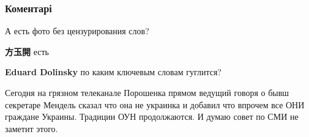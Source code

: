  
 
 
 
 
\subsubsection{Коментарі}

\begin{itemize}
 
А есть фото без цензурирования слов?

\begin{itemize}
 
\textbf{方玉開} есть

 
\textbf{Eduard Dolinsky} по каким ключевым словам гуглится?
\end{itemize}

 

Сегодня на грязном телеканале Порошенка прямом ведущий говоря о бывш секретаре
Мендель сказал что она не украинка и добавил что впрочем все ОНИ граждане
Украины. Традиции ОУН продолжаются. И думаю совет по СМИ не заметит этого.

\begin{itemize}
 

\end{itemize}
\end{itemize}

